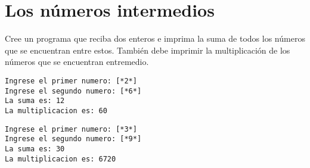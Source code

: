 
\section{Los números intermedios}

Cree un programa que reciba dos enteros e imprima la suma de todos los números que se encuentran entre estos. También debe imprimir la multiplicación de los números que se encuentran entremedio.


\begin{lstlisting}[style=consola]
Ingrese el primer numero: [*2*]
Ingrese el segundo numero: [*6*]
La suma es: 12
La multiplicacion es: 60
\end{lstlisting}

\begin{lstlisting}[style=consola]
Ingrese el primer numero: [*3*]
Ingrese el segundo numero: [*9*]
La suma es: 30
La multiplicacion es: 6720
\end{lstlisting}

